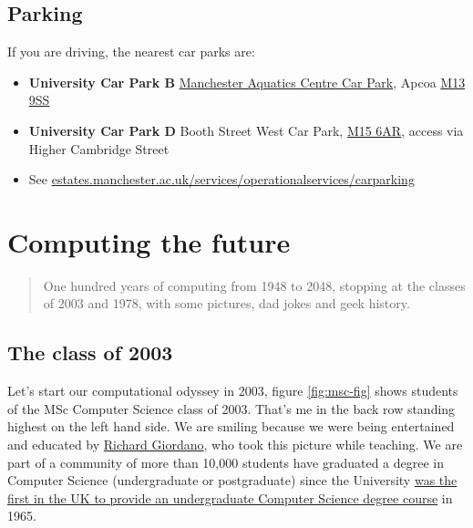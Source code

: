 \documentclass[
  12pt,
]{book}
\providecommand{\tightlist}{%
  \setlength{\itemsep}{0pt}\setlength{\parskip}{0pt}}
\begin{document}
\hypertarget{parking}{%
\section{Parking}\label{parking}}

If you are driving, the nearest car parks are:

\begin{itemize}
\tightlist
\item
  \textbf{University Car Park B} \href{https://www.apcoa.co.uk/parking-in/manchester/aquatics-centre/}{Manchester Aquatics Centre Car Park}, Apcoa \href{http://maps.google.co.uk/maps?q=M13+9SS}{M13 9SS}
\item
  \textbf{University Car Park D} Booth Street West Car Park, \href{http://maps.google.co.uk/maps?q=M15+6AR}{M15 6AR}, access via Higher Cambridge Street
\item
  See \href{https://www.estates.manchester.ac.uk/services/operationalservices/carparking/}{estates.manchester.ac.uk/services/operationalservices/carparking}
\end{itemize}

\hypertarget{appendix-appendix}{%
\appendix}


\hypertarget{mastersofscience}{%
\chapter{Computing the future}\label{mastersofscience}}

\begin{quote}
One hundred years of computing from 1948 to 2048, stopping at the classes of 2003 and 1978, with
some pictures, dad jokes and geek history.
\end{quote}

\hypertarget{y2003}{%
\section{The class of 2003}\label{y2003}}

Let's start our computational odyssey in 2003, figure \ref{fig:msc-fig} shows students of the MSc Computer Science class of 2003. That's me in the back row standing highest on the left hand side. We are smiling because we were being entertained and educated by \href{https://www.southampton.ac.uk/healthsciences/about/staff/richard_giordano.page}{Richard Giordano}, who took this picture while teaching. We are part of a community of more than 10,000 students have graduated a degree in Computer Science (undergraduate or postgraduate) since the University \href{http://www.bbc.co.uk/manchester/content/articles/2005/11/07/baby_computer_40_interview_feature.shtml}{was the first in the UK to provide an undergraduate Computer Science degree course} in 1965. \citep{babygrowsup}
\end{document}
